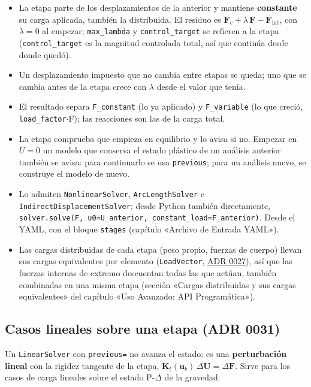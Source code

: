 \documentclass[11pt,oneside]{report}
\begin{document}
\begin{itemize}
  \item La etapa parte de los desplazamientos de la anterior y mantiene \textbf{constante} su carga aplicada, también la distribuida. El residuo es $\mathbf F_c + \lambda\,\mathbf F - \mathbf F_\text{int}$, con $\lambda = 0$ al empezar; \texttt{max\_lambda} y \texttt{control\_target} se refieren a la etapa (\texttt{control\_target} es la magnitud controlada total, así que continúa desde donde quedó).
  \item Un desplazamiento impuesto que no cambia entre etapas se queda; uno que se cambia antes de la etapa crece con $\lambda$ desde el valor que tenía.
  \item El resultado separa \texttt{F\_constant} (lo ya aplicado) y \texttt{F\_variable} (lo que creció, \texttt{load\_factor}\ensuremath{\cdot}F); las reacciones son las de la carga total.
  \item La etapa comprueba que empieza en equilibrio y lo avisa si no. Empezar en $U = 0$ un modelo que conserva el estado plástico de un análisis anterior también se avisa: para continuarlo se usa \texttt{previous}; para un análisis nuevo, se construye el modelo de nuevo.
  \item Lo admiten \texttt{NonlinearSolver}, \texttt{ArcLengthSolver} e \texttt{IndirectDisplacementSolver}; desde Python también directamente, \texttt{solver.\allowbreak{}solve(F, u0=U\_\allowbreak{}anterior, constant\_\allowbreak{}load=F\_\allowbreak{}anterior)}. Desde el YAML, con el bloque \texttt{stages} (capítulo «Archivo de Entrada YAML»).
  \item Las cargas distribuidas de cada etapa (peso propio, fuerzas de cuerpo) llevan sus cargas equivalentes por elemento (\texttt{LoadVector}, \href{https://github.com/jretamav/solidum-fem/blob/main/docs/adr/0027-cargas-con-sus-cargas-equivalentes.md}{ADR 0027}), así que las fuerzas internas de extremo descuentan todas las que actúan, también combinadas en una misma etapa (sección «Cargas distribuidas y sus cargas equivalentes» del capítulo «Uso Avanzado: API Programática»).
\end{itemize}

\subsection{Casos lineales sobre una etapa (ADR 0031)}

Un \texttt{LinearSolver} con \texttt{previous=} no avanza el estado: es una \textbf{perturbación lineal} con la rigidez tangente de la etapa, $\mathbf K_t(\mathbf u_b)\,\Delta\mathbf U = \Delta\mathbf F$. Sirve para los casos de carga lineales sobre el estado P-\ensuremath{\Delta} de la gravedad:
\end{document}
